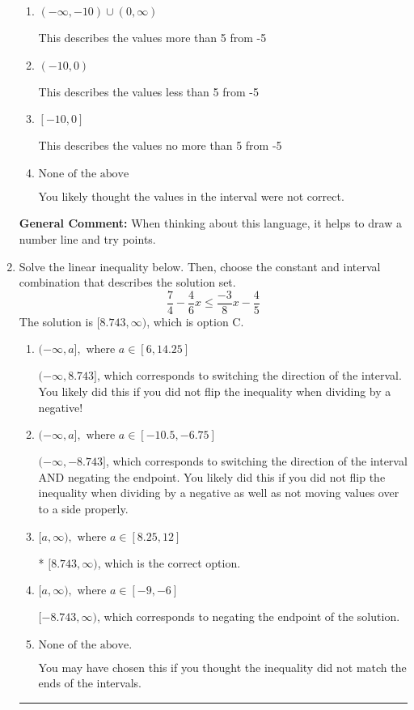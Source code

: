 \documentclass{extbook}[14pt]
\newcommand{\litem}[1]{\item #1

\rule{\textwidth}{0.4pt}}
\begin{document}
\begin{enumerate}
{\begin{enumerate}[label=\Alph*.]
This describes the values no less than 5 from -5
\item \( (-\infty, -10) \cup (0, \infty) \)

This describes the values more than 5 from -5
\item \( (-10, 0) \)

This describes the values less than 5 from -5
\item \( [-10, 0] \)

This describes the values no more than 5 from -5
\item \( \text{None of the above} \)

You likely thought the values in the interval were not correct.
\end{enumerate}

\textbf{General Comment:} When thinking about this language, it helps to draw a number line and try points.
}
\litem{
Solve the linear inequality below. Then, choose the constant and interval combination that describes the solution set.
\[ \frac{7}{4} - \frac{4}{6} x \leq \frac{-3}{8} x - \frac{4}{5} \]The solution is \( [8.743, \infty) \), which is option C.\begin{enumerate}[label=\Alph*.]
\item \( (-\infty, a], \text{ where } a \in [6, 14.25] \)

 $(-\infty, 8.743]$, which corresponds to switching the direction of the interval. You likely did this if you did not flip the inequality when dividing by a negative!
\item \( (-\infty, a], \text{ where } a \in [-10.5, -6.75] \)

 $(-\infty, -8.743]$, which corresponds to switching the direction of the interval AND negating the endpoint. You likely did this if you did not flip the inequality when dividing by a negative as well as not moving values over to a side properly.
\item \( [a, \infty), \text{ where } a \in [8.25, 12] \)

* $[8.743, \infty)$, which is the correct option.
\item \( [a, \infty), \text{ where } a \in [-9, -6] \)

 $[-8.743, \infty)$, which corresponds to negating the endpoint of the solution.
\item \( \text{None of the above}. \)

You may have chosen this if you thought the inequality did not match the ends of the intervals.
\end{enumerate}

}
\end{enumerate}
\end{document}
